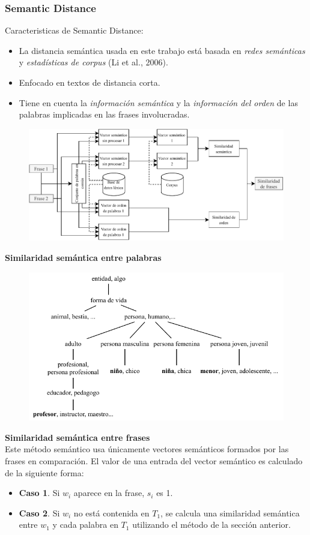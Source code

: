 \begin{frame}[allowframebreaks]
	\frametitle{Semantic Distance}
	Caracteristicas de Semantic Distance:
	\bigskip
	\begin{itemize}[<*>]
		\item La distancia semántica usada en este trabajo está basada en \textit{redes semánticas} y \textit{estadísticas de corpus} (Li et al., 2006).
		\item Enfocado en textos de distancia corta.
		\item Tiene en cuenta la \textit{información semántica} y la \textit{información del orden} de las palabras implicadas en las frases involucradas.
	\end{itemize}

	\begin{figure}
		\centering
		\includegraphics[width=0.7\linewidth]{../7_marco_teorico/imagenes/similaridad_sematinca_metodo}
		\label{fig:similaridadsematincametodo}
	\end{figure}

	\framebreak

	\textbf{Similaridad semántica entre palabras}
	\bigskip
	\begin{figure}
		\centering
		\includegraphics[width=0.7\linewidth]{../7_marco_teorico/imagenes/taxonomia_semantica}
		\label{fig:taxonomiasemantica}
	\end{figure}

	\framebreak

	\textbf{Similaridad semántica entre frases} \\
	\bigskip
	Este método semántico usa únicamente vectores semánticos formados por las frases en comparación. El valor de una entrada del vector semántico es calculado de la siguiente forma:
	\begin{itemize}[<*>]
		\item \textbf{Caso 1}. Si \(w_i\) aparece en la frase, \(s_i\) es 1.
		\item \textbf{Caso 2}. Si \(w_i\) no está contenida en \(T_1\), se calcula una similaridad semántica entre \(w_1\) y cada palabra en \(T_1\) utilizando el método de la sección anterior.
	\end{itemize}


\end{frame}
